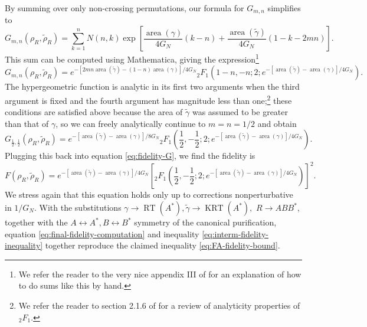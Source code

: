 \documentclass[a4paper,11pt]{article}
\renewcommand{\tilde}{\widetilde}
\newcommand{\area}{\operatorname{area}}
\newcommand{\RT}{\operatorname{RT}}
\newcommand{\KRT}{\operatorname{KRT}}
\begin{document}
By summing over only non-crossing permutations, our formula for $G_{m,n}$ simplifies to
\begin{equation}
    G_{m, n}(\rho_R, \tilde{\rho}_{R})
        = \sum_{k=1}^n N(n, k) \exp\left[ \frac{\area(\gamma)}{4 G_N} (k -  n) + \frac{\area(\tilde{\gamma})}{4 G_N} (1 - k - 2mn)  \right].
\end{equation}
This sum can be computed using Mathematica, giving the expression\footnote{We refer the reader to the very nice appendix III of \cite{kudler2021relative} for an explanation of how to do sums like this by hand.}
\begin{equation} \label{eq:G-formula}
    G_{m, n}(\rho_R, \tilde{\rho}_{R})
        = e^{- [2 m n \area(\tilde{\gamma}) - (1-n) \area(\gamma)]/4 G_N} {}_2 F_1 \left(1-n, -n; 2; e^{- [\area(\tilde{\gamma}) - \area(\gamma)]/ 4 G_N} \right).
\end{equation}
The hypergeometric function is analytic in its first two arguments when the third argument is fixed and the fourth argument has magnitude less than one;\footnote{We refer the reader to section 2.1.6 of \cite{bateman1953higher} for a review of analyticity properties of ${}_{2}F_1$.} these conditions are satisfied above because the area of $\tilde{\gamma}$ was assumed to be greater than that of $\gamma$, so we can freely analytically continue to $m=n=1/2$ and obtain
\begin{equation}
    G_{\frac{1}{2}, \frac{1}{2}}(\rho_R, \tilde{\rho}_{R})
        = e^{-[\area(\tilde{\gamma}) - \area(\gamma)]/8 G_N} {}_2 F_1 \left(\frac{1}{2}, -\frac{1}{2}; 2; e^{- [\area(\tilde{\gamma}) - \area(\gamma)]/ 4 G_N} \right).
\end{equation}
Plugging this back into equation \eqref{eq:fidelity-G}, we find the fidelity is
\begin{equation} \label{eq:final-fidelity-computation}
    F(\rho_{R}, \tilde{\rho}_{R})
        = e^{-[\area(\tilde{\gamma}) - \area(\gamma)]/4 G_N} \left[{}_2 F_1 \left(\frac{1}{2}, -\frac{1}{2}; 2; e^{- [\area(\tilde{\gamma}) - \area(\gamma)]/ 4 G_N} \right) \right]^2.
\end{equation}
We stress again that this equation holds only up to corrections nonperturbative in $1/G_N$. With the substitutions $\gamma \rightarrow \RT(A^*), \tilde{\gamma} \rightarrow \KRT(A^*),$ $R \rightarrow ABB^*$, together with the $A \leftrightarrow A^*, B \leftrightarrow B^*$ symmetry of the canonical purification, equation \eqref{eq:final-fidelity-computation} and inequality \eqref{eq:interm-fidelity-inequality} together reproduce the claimed inequality \eqref{eq:FA-fidelity-bound}.
\end{document}
